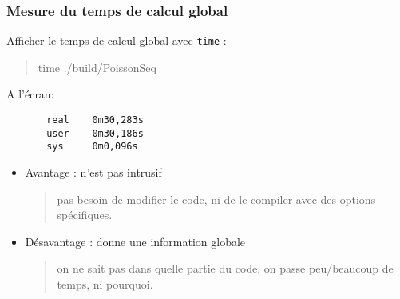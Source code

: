 \documentclass{beamer}
\begin{document}
\begin{frame}[fragile]
	\frametitle{Mesure du temps de calcul global}
    \vfill
	Afficher le temps de calcul global avec {\tt time} :
		\begin{quote}
	       time ./build/PoissonSeq
        \end{quote}
	
	A l'\'ecran:\begin{minipage}[t]{4cm}
	\begin{verbatim}
	   real    0m30,283s
	   user    0m30,186s
	   sys     0m0,096s
	\end{verbatim}
	\end{minipage}

    \vfill
	\begin{itemize}
		\item Avantage : n'est pas intrusif
		\begin{quote}
			pas besoin de modifier le code, ni de le compiler avec des options sp\'ecifiques.
		\end{quote} 
		\item D\'esavantage : donne une information globale
		\begin{quote}
			on ne sait pas dans quelle partie du code, on passe peu/beaucoup de temps, ni pourquoi.
		\end{quote} 
	\end{itemize}
    \vfill
\end{frame}
\end{document}
